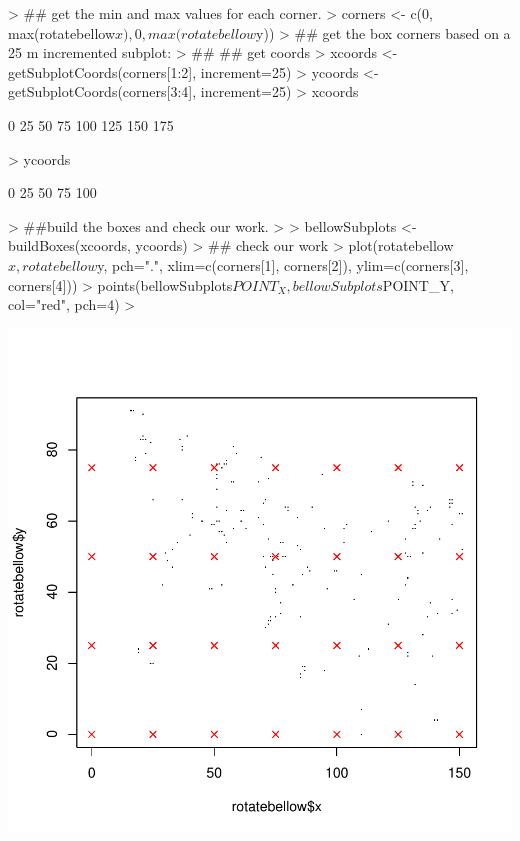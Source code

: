 \documentclass{report}
\begin{document}
\begin{Schunk}
\begin{Sinput}
> ## get the min and max values for each corner.
> corners <- c(0, max(rotatebellow$x), 0, max(rotatebellow$y))
> ## get the box corners based on a 25 m incremented subplot:
> ## ## get coords
>   xcoords <- getSubplotCoords(corners[1:2], increment=25)
>   ycoords <- getSubplotCoords(corners[3:4], increment=25)
>   xcoords
\end{Sinput}
\begin{Soutput}
[1]   0  25  50  75 100 125 150 175
\end{Soutput}
\begin{Sinput}
>   ycoords
\end{Sinput}
\begin{Soutput}
[1]   0  25  50  75 100
\end{Soutput}
\begin{Sinput}
> ##build the boxes and check our work.
> 
>   bellowSubplots <- buildBoxes(xcoords, ycoords)
>   ## check our work
> plot(rotatebellow$x, rotatebellow$y, pch=".", xlim=c(corners[1], corners[2]), ylim=c(corners[3], corners[4]))
> points(bellowSubplots$POINT_X, bellowSubplots$POINT_Y, col="red", pch=4)
> 
\end{Sinput}
\end{Schunk}
\includegraphics{disperseRmanual-016}




\end{document}
